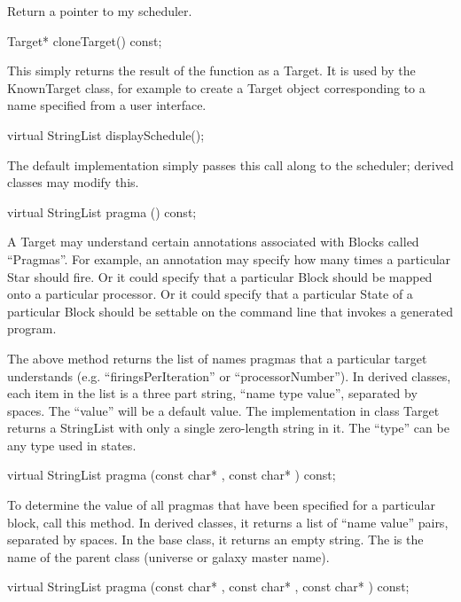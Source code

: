Return a pointer to my scheduler.

\begin{example}
Target* cloneTarget() const;
\end{example}

This simply returns the result of the  function as a Target.
It is used by the KnownTarget class, for example to create a Target
object corresponding to a name specified from a user interface.

\begin{example}
virtual StringList displaySchedule();
\end{example}

The default implementation simply passes this call along to the
scheduler; derived classes may modify this.

\begin{example}
virtual StringList pragma () const;
\end{example}

A Target may understand certain annotations associated with Blocks
called ``Pragmas''.  For example, an annotation may specify how
many times a particular Star should fire.
Or it could specify that a particular Block should be mapped
onto a particular processor.  Or it could specify that a particular
State of a particular Block should be settable on the command line
that invokes a generated program.

The above method returns the list of names
pragmas that a particular target understands (e.g. ``firingsPerIteration'' or
``processorNumber'').
In derived classes, each item in the list is a three
part string, ``name type value'', separated by spaces.
The ``value'' will be a default value.
The implementation in class Target returns a StringList
with only a single zero-length string in it.
The ``type'' can be any type used in states.

\begin{example}
virtual StringList pragma (const char* , const char* ) const;
\end{example}

To determine the value of all pragmas that have been specified for a
particular block, call this method.
In derived classes, it returns a list of ``name value'' pairs, separated
by spaces.
In the base class, it returns an empty string.
The  is the name of the parent class (universe or
galaxy master name).

\begin{example}
virtual StringList pragma (const char* ,
	const char* ,
	const char* ) const;
\end{example}

